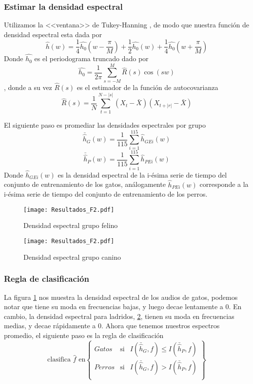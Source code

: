 \documentclass[twocolumn,10pt]{asme2ej}
\begin{document}
\subsubsection*{Estimar la densidad espectral} %
\label{ssub:estimar_la_densidad_espectral}
Utilizamos la <<ventana>> de Tukey-Hanning \cite{PRIESTLEY}, de modo que nuestra funci\'on de densidad espectral esta dada por
$$\hat{h}(w)=\frac{1}{4}\hat{h_0}\left(w-\frac{\pi}{M}\right)+\frac{1}{2}\hat{h_0}\left(w\right)+\frac{1}{4}\hat{h_0}\left(w+\frac{\pi}{M}\right)$$
Donde $\hat{h_0}$ es el periodograma truncado dado por 
$$\hat{h_0}=\frac{1}{2\pi}\sum^{M}_{s=-M}\hat{R}(s)\cos(sw)$$, donde a su vez $\hat{R}(s)$ es el estimador de la funci\'on de autocovarianza
$$\hat{R}(s)=\frac{1}{N}\sum^{N-|s|}_{t=1}(X_t-\bar{X})(X_{t+|r|}-\bar{X})$$

El siguiente paso es promediar las densidades espectrales por grupo 
$$
\bar{\hat{h}}_G(w)=\frac{1}{115}\sum_{i=1}^{115}\hat{h}_{GEi}(w)
$$
$$
\bar{\hat{h}}_P(w)=\frac{1}{115}\sum_{i=1}^{115}\hat{h}_{PEi}(w)
$$
Donde $\hat{h}_{GEi}(w)$ es la densidad espectral de la i-\'esima serie de tiempo del conjunto de entrenamiento de los gatos, an\'alogamente $\hat{h}_{PEi}(w)$ corresponde a la i-\'esima serie de tiempo del conjunto de entrenamiento de los perros.
\begin{figure}[h]
  \centering
    \texttt{[image: Resultados\_F2.pdf]}
  \caption{Densidad espectral grupo felino}
  \label{plot:de_g1}
\end{figure}
\begin{figure}[h]
  \centering
    \texttt{[image: Resultados\_F2.pdf]}
  \caption{Densidad espectral grupo canino}
  \label{plot:de_p1}
\end{figure}
\subsubsection*{Regla de clasificaci\'on} %
\label{ssub:regla_de_clasificacion}
La figura \ref{plot:de_g1} nos muestra la densidad espectral de los audios de gatos, podemos notar que tiene su moda en frecuencias bajas, y luego decae lentamente a 0. En cambio, la densidad espectral para ladridos, \ref{plot:de_p1}, tienen su moda en frecuencias medias, y decae r\'apidamente a 0. Ahora que tenemos nuestros espectros promedio, el siguiente paso es la regla de clasificaci\'on\\

$$\text{clasifica } \hat{f} \text{ en}\left\{
\begin{array}{ccc}
Gatos &\text{si}&I(\bar{\hat{h}}_G, f)\leq I(\bar{\hat{h}}_P, f)\\
Perros &\text{si}&I(\bar{\hat{h}}_G, f)> I(\bar{\hat{h}}_P, f)\\
\end{array}
\right\}$$
\end{document}
